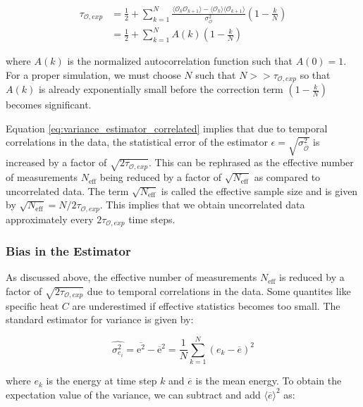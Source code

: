 \begin{align}
  \label{eq:autocorrelation_time}
  \tau_{\mathcal{O}, exp} &= \frac{1}{2} + \sum_{k=1}^{N} \frac{\langle\mathcal{O}_k\mathcal{O}_{k+1}\rangle - \langle\mathcal{O}_k\rangle\langle\mathcal{O}_{k+1}\rangle}{\sigma_{\mathcal{O}}^2} \left(1-\frac{k}{N}\right) \\
        &= \frac{1}{2} + \sum_{k=1}^{N} A(k) \left(1-\frac{k}{N}\right)
\end{align}

where $A(k)$ is the normalized autocorrelation function such that $A(0) = 1$.
For a proper simulation, we must choose $N$ such that $N>>\tau_{\mathcal{O},
exp}$ so that $A(k)$ is already exponentially small before the correction term
$\left(1-\frac{k}{N}\right)$ becomes significant. 

Equation \ref{eq:variance_estimator_correlated} implies that due to temporal
correlations in the data, the statistical error of the estimator $\epsilon =
\sqrt{\sigma^2_{\overline{\mathcal{O}}}}$ is increased by a factor of
$\sqrt{2\tau_{\mathcal{O}, exp}}$. This can be rephrased as the effective number
of measurements $N_{\text{eff}}$ being reduced by a factor of
$\sqrt{N_{\text{eff}}}$ as compared to uncorrelated data. The term
$\sqrt{N_{\text{eff}}}$ is called the effective sample size and is given by
$\sqrt{N_{\text{eff}}} = N/2\tau_{\mathcal{O}, exp}$. This implies that we
obtain uncorrelated data approximately every $2\tau_{\mathcal{O}, exp}$ time
steps.


\subsubsection{Bias in the Estimator}
As discussed above, the effective number of measurements $N_{\text{eff}}$ is
reduced by a factor of $\sqrt{2\tau_{\mathcal{O}, exp}}$ due to temporal
correlations in the data. Some quantites like specific heat $C$ are underestimed
if effective statistics becomes too small. The standard estimator for variance
is given by:

\begin{equation}
  \hat{\sigma_{e_i}^2} = \overline{\text{e}^2} - \overline{\text{e}}^2 = \frac{1}{N}\sum_{k=1}^{N}(e_k-\overline{e})^2
\end{equation}

where $e_k$ is the energy at time step $k$ and $\overline{e}$ is the mean
energy. To obtain the expectation value of the variance, we can subtract and add
$\langle\overline{e}\rangle^2$ as:


